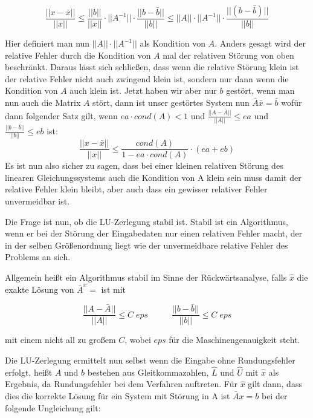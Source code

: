 \documentclass[course=erap]{aspdoc}
\begin{document}
\begin{equation}
\label{norm}
\frac{||x- \bar{x}||}{||x||}   \leq    \frac{||b||} {||x||} \cdot ||A^{-1}|| \cdot \frac{||b-\bar{b}||}{||b||} \leq ||A|| \cdot ||A^{-1}|| \cdot \frac{||(b-\bar{b})||} {||b||}
\end{equation}

 
Hier definiert man nun $||A|| \cdot ||A^{-1}||$ als Kondition von $A$. Anders gesagt wird 
der relative Fehler durch die Kondition von $A$ mal der relativen Störung 
von oben beschränkt. Daraus lässt sich schließen, dass wenn die relative Störung klein 
ist der relative Fehler nicht auch zwingend klein ist, sondern nur dann wenn die 
Kondition von $A$ auch klein ist.
Jetzt haben wir aber nur $b$ gestört, wenn man nun auch die Matrix $A$ stört, dann ist 
unser gestörtes System nun $\bar{A} \bar{x} = \bar{b}$ wofür dann folgender Satz gilt, wenn $ea \cdot cond(A) < 1$
 und $\frac{||A - \bar{A}||} {||A||} \leq ea $	und 	$\frac{||b - \bar{b}||} {||b||} \leq eb $ ist:\\
\begin{equation}
\frac{||x-\bar{x}||} {||x||} \leq \frac{cond(A)} {1- ea \cdot cond(A)} \cdot (ea + eb)   
\end{equation}
Es ist nun also sicher zu sagen, dass bei einer kleinen relativen Störung des linearen 
Gleichungssystems auch die Kondition von A klein sein muss damit der relative Fehler 
klein bleibt, aber auch dass ein gewisser relativer Fehler unvermeidbar ist.

Die Frage ist nun, ob die LU-Zerlegung stabil ist.
Stabil ist ein Algorithmus, wenn er bei der Störung der Eingabedaten nur einen relativen Fehler macht, 
der in der selben Größenordnung liegt wie der unvermeidbare relative Fehler des Problems an sich. 

Allgemein heißt ein Algorithmus stabil im Sinne der Rückwärtsanalyse, 
falls $\hat{x}$ die exakte Lösung von $\bar{A}^x =$ ist mit 							

 \begin{equation}
\label{norm}
\frac{|| A - \bar{A}||}{||A||} \leq C \; eps \;\; \;\;\;\;\;\;\;\;  \frac{|| b - \bar{b}||}{||b||} \leq C \; eps
\end{equation}

 mit einem nicht all zu großem $C$, wobei $eps$ für die Maschinengenauigkeit steht.

Die LU-Zerlegung ermittelt nun selbst wenn die Eingabe ohne 
Rundungsfehler erfolgt, heißt $A$ und $b$ bestehen aus Gleitkommazahlen, $\hat{L}$ und $\hat{U}$ mit 
$\hat{x}$ als Ergebnis, da Rundungsfehler bei dem Verfahren auftreten. Für $\hat{x}$ gilt 
dann, dass dies die korrekte Lösung für ein System mit Störung in A ist $\bar{A}x=b$ bei der 
folgende Ungleichung gilt:
\end{document}
